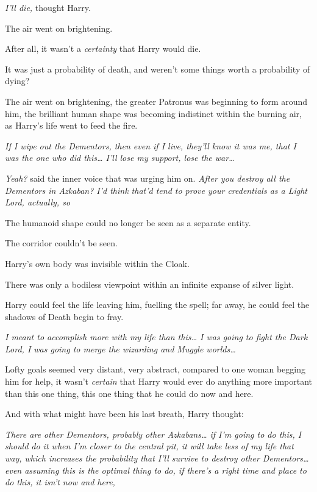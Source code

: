 \emph{I'll die,} thought Harry.

The air went on brightening.

After all, it wasn't a \emph{certainty} that Harry would die.

It was just a probability of death, and weren't some things worth a probability of dying?

The air went on brightening, the greater Patronus was beginning to form around him, the brilliant human shape was becoming indistinct within the burning air, as Harry's life went to feed the fire.

\emph{If I wipe out the Dementors, then even if I live, they'll know it was me, that I was the one who did this{\ldots} I'll lose my support, lose the war{\ldots}}

\emph{Yeah?} said the inner voice that was urging him on. \emph{After you destroy all the Dementors in Azkaban? I'd think that'd tend to prove your credentials as a Light Lord, actually, so }

The humanoid shape could no longer be seen as a separate entity.

The corridor couldn't be seen.

Harry's own body was invisible within the Cloak.

There was only a bodiless viewpoint within an infinite expanse of silver light.

Harry could feel the life leaving him, fuelling the spell; far away, he could feel the shadows of Death begin to fray.

\emph{I meant to accomplish more with my life than this{\ldots} I was going to fight the Dark Lord, I was going to merge the wizarding and Muggle worlds{\ldots}}

Lofty goals seemed very distant, very abstract, compared to one woman begging him for help, it wasn't \emph{certain} that Harry would ever do anything more important than this one thing, this one thing that he could do now and here.

And with what might have been his last breath, Harry thought:

\emph{There are other Dementors, probably other Azkabans{\ldots} if I'm going to do this, I should do it when I'm closer to the central pit, it will take less of my life that way, which increases the probability that I'll survive to destroy other Dementors{\ldots} even assuming this is the optimal thing to do, if there's a right time and place to do this, it isn't now and here, }

